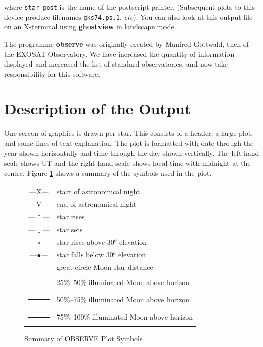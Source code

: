 \documentclass[11pt,noabs]{starlink}
\begin{document}
\begin{terminalv}
\end{terminalv}

where {\tt{star\_post}} is the name of the postscript printer.
(Subsequent plots to this device produce filenames \texttt{gks74.ps.1},
{\em{etc}}). You can also look at this output file on an X-terminal
using {\bf{ghostview}} in landscape mode.

The programme {\bf{observe}} was originally created by Manfred Gottwald,
then of the EXOSAT Observatory. We have increased the quantity of
information displayed and increased the list of standard observatories,
and now take responsibility for this software.


\section{Description of the Output}
\label{sec:description}

One screen of graphics is drawn per star. This consists of a header, a
large plot, and some lines of text explanation. The plot is formatted
with date through the year shown horizontally and time through the day
shown vertically. The  left-hand scale shows UT and the right-hand
scale shows local time with midnight at the centre. Figure
\ref{fig:sum} shows a summary of the symbols used in the plot.

\begin{figure}[h]\caption{Summary of OBSERVE Plot Symbols}
\label{fig:sum}
\begin{center}
\begin{tabular}{|c|l|}
\hline
\large
---\textsf{X}--- & start of astronomical night \\
---\textsf{V}--- & end of astronomical night \\
---$\uparrow$--- & star rises \\
---$\downarrow$--- & star sets \\
---$\circ$--- & star rises above 30$^o$ elevation\\
---$\bullet$--- & star falls below 30$^o$ elevation\\
- - - - & great circle Moon-star distance \\
\rule{0.1mm}{4mm} & 25\%--50\% illuminated Moon above horizon\\
\rule{0.3mm}{4mm} & 50\%--75\% illuminated Moon above horizon\\
\rule{0.5mm}{4mm} & 75\%--100\% illuminated Moon above horizon\\
\hline
\end{tabular}
\end{center}
\end{figure}
\end{document}
